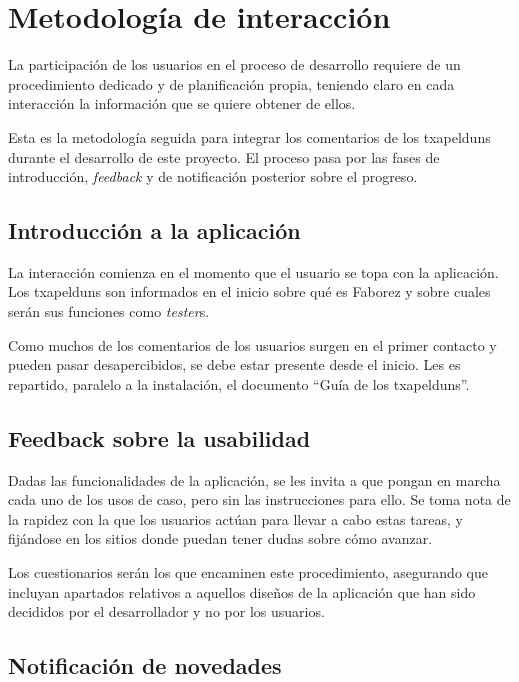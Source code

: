 \documentclass[main]{subfiles}
\begin{document}
\section{Metodología de interacción}

La participación de los usuarios en el proceso de desarrollo requiere de un procedimiento dedicado y de planificación propia, teniendo claro en cada interacción la información que se quiere obtener de ellos.

Esta es la metodología seguida para integrar los comentarios de los \glspl{txapeldun} durante el desarrollo de este proyecto. El proceso pasa por las fases de introducción, \emph{feedback} y de notificación posterior sobre el progreso.

\subsection{Introducción a la aplicación}

La interacción comienza en el momento que el usuario se topa con la aplicación. Los \glspl{txapeldun} son informados en el inicio sobre qué es Faborez y sobre cuales serán sus funciones como \emph{tester}s.

Como muchos de los comentarios de los usuarios surgen en el primer contacto y pueden pasar desapercibidos, se debe estar presente desde el inicio. Les es repartido, paralelo a la instalación, el documento \enquote{Guía de los \glspl{txapeldun}}.

\subsection{Feedback sobre la usabilidad}

Dadas las funcionalidades de la aplicación, se les invita a que pongan en marcha cada uno de los usos de caso, pero sin las instrucciones para ello. Se toma nota de la rapidez con la que los usuarios actúan para llevar a cabo estas tareas, y fijándose en los sitios donde puedan tener dudas sobre cómo avanzar.

Los cuestionarios serán los que encaminen este procedimiento, asegurando que incluyan apartados relativos a aquellos diseños de la aplicación que han sido decididos por el desarrollador y no por los usuarios.

\subsection{Notificación de novedades}
\end{document}
